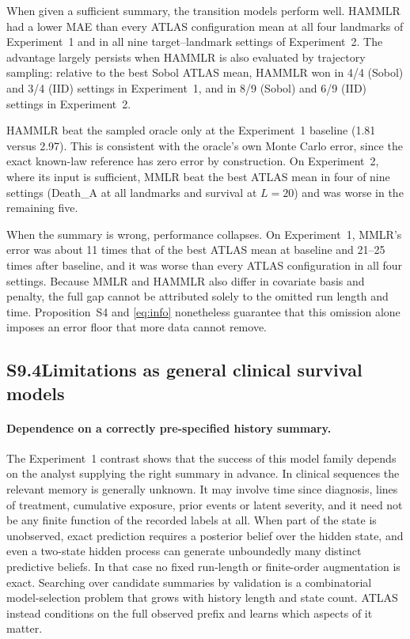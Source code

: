 \documentclass[11pt]{article}
\begin{document}
When given a sufficient summary, the transition models perform well. HAMMLR had a lower MAE than every ATLAS configuration mean at all four landmarks of Experiment~1 and in all nine target--landmark settings of Experiment~2. The advantage largely persists when HAMMLR is also evaluated by trajectory sampling: relative to the best Sobol ATLAS mean, HAMMLR won in 4/4 (Sobol) and 3/4 (IID) settings in Experiment~1, and in 8/9 (Sobol) and 6/9 (IID) settings in Experiment~2.

HAMMLR beat the sampled oracle only at the Experiment~1 baseline (1.81 versus 2.97). This is consistent with the oracle's own Monte Carlo error, since the exact known-law reference has zero error by construction. On Experiment~2, where its input is sufficient, MMLR beat the best ATLAS mean in four of nine settings (Death\_A at all landmarks and survival at $L=20$) and was worse in the remaining five.

When the summary is wrong, performance collapses. On Experiment~1, MMLR's error was about 11 times that of the best ATLAS mean at baseline and 21--25 times after baseline, and it was worse than every ATLAS configuration in all four settings. Because MMLR and HAMMLR also differ in covariate basis and penalty, the full gap cannot be attributed solely to the omitted run length and time. Proposition~S4 and \eqref{eq:info} nonetheless guarantee that this omission alone imposes an error floor that more data cannot remove.

\subsection*{S9.4\quad Limitations as general clinical survival models}

\paragraph{Dependence on a correctly pre-specified history summary.} The Experiment~1 contrast shows that the success of this model family depends on the analyst supplying the right summary in advance. In clinical sequences the relevant memory is generally unknown. It may involve time since diagnosis, lines of treatment, cumulative exposure, prior events or latent severity, and it need not be any finite function of the recorded labels at all. When part of the state is unobserved, exact prediction requires a posterior belief over the hidden state, and even a two-state hidden process can generate unboundedly many distinct predictive beliefs. In that case no fixed run-length or finite-order augmentation is exact. Searching over candidate summaries by validation is a combinatorial model-selection problem that grows with history length and state count. ATLAS instead conditions on the full observed prefix and learns which aspects of it matter.
\end{document}
